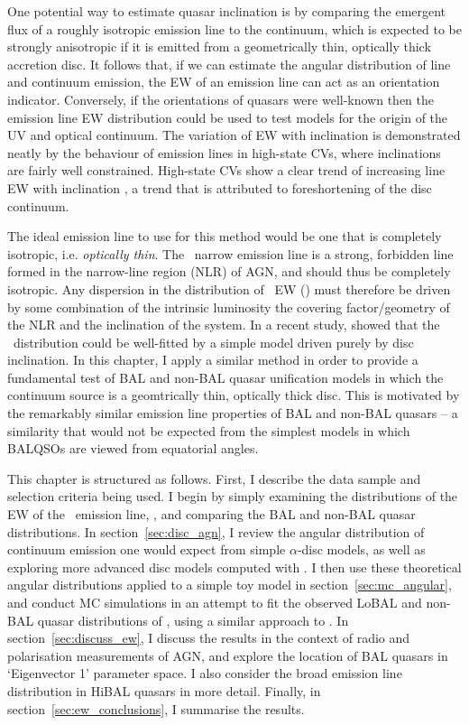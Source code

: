 One potential way to estimate quasar inclination is by comparing
the emergent flux of a roughly isotropic emission line to the continuum, which is
expected to be strongly anisotropic if it is emitted from a geometrically thin, 
optically thick accretion disc. 
It follows that, if we can estimate the angular distribution of line and continuum emission,
the EW of an emission line can act as an orientation indicator. Conversely, if the orientations
of quasars were well-known then the emission line EW distribution could be used to test models
for the origin of the UV and optical continuum.
The variation of EW with inclination is demonstrated neatly by the behaviour 
of emission lines in high-state CVs, where inclinations are fairly well constrained.
High-state CVs show a clear trend of increasing line EW with inclination 
\citep[][see also sections~\ref{sec:NLs} and \ref{sec:modela_spectra}]{hessman1984,patterson1984,echevarria1988,noebauer},
a trend that is attributed to foreshortening of the disc continuum.

The ideal emission line to use for this method would be one that is completely isotropic,
i.e. {\em optically thin}. The \oiiifull\ narrow emission line is a strong, forbidden line
formed in the narrow-line region (NLR) of AGN, and should thus be completely isotropic.
Any dispersion in the distribution of \oiiifull\ EW (\ewo) must therefore be driven by some combination of
the intrinsic luminosity \citep{borosongreen} 
the covering factor/geometry of the NLR \citep{baskin2005} and the 
inclination of the system. In a recent study, \citet{risaliti2011} showed that 
the \ewo\ distribution could be well-fitted by a simple model driven purely by disc inclination.
In this chapter, I apply a similar method in order to provide a fundamental test of
BAL and non-BAL quasar unification models in which the continuum source is a geomtrically
thin, optically thick disc. This is motivated by the remarkably similar
emission line properties of BAL and non-BAL quasars -- a similarity that would not
be expected from the simplest models in which BALQSOs are viewed from equatorial angles.

This chapter is structured as follows. First, I describe
the data sample and selection criteria being used. I begin by
simply examining the distributions of the EW of the \oiiifull\ emission line,
\ewo, and comparing the BAL and non-BAL quasar distributions. 
In section~\ref{sec:disc_agn}, I review the angular distribution of 
continuum emission one would expect from simple $\alpha$-disc models, 
as well as exploring more advanced disc models computed
with \agn. I then use these theoretical 
angular distributions applied to a simple toy model in 
section~\ref{sec:mc_angular}, and conduct MC simulations in an attempt to fit 
the observed LoBAL and non-BAL quasar distributions of \ewo, using a similar approach to 
\cite{risaliti2011}. In section~\ref{sec:discuss_ew}, I discuss the results
in the context of radio and polarisation measurements of AGN,
and explore the location of BAL quasars in `Eigenvector 1' parameter space.
I also consider the broad emission line distribution in HiBAL quasars in more detail. 
Finally, in section~\ref{sec:ew_conclusions}, I summarise the results.

